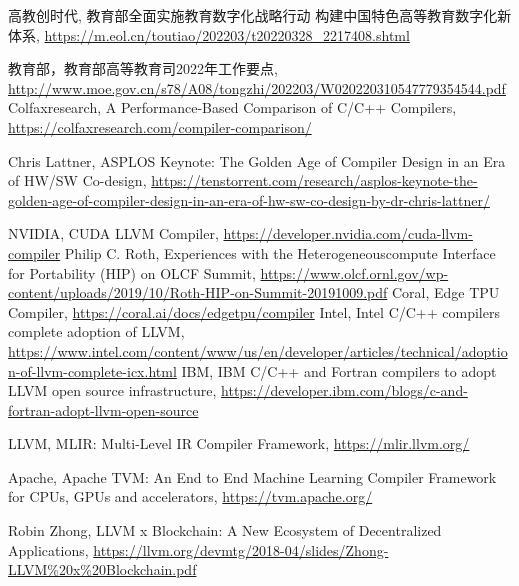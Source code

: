 \documentclass{SCIS2020cn}
\begin{document}
\begin{thebibliography}{99}
    高教创时代, 教育部全面实施教育数字化战略行动 构建中国特色高等教育数字化新体系, \url{https://m.eol.cn/toutiao/202203/t20220328_2217408.shtml}

    教育部，教育部高等教育司2022年工作要点, \url{http://www.moe.gov.cn/s78/A08/tongzhi/202203/W020220310547779354544.pdf}
     Colfaxresearch, A Performance-Based Comparison of C/C++ Compilers, \url{https://colfaxresearch.com/compiler-comparison/}

     Chris Lattner, ASPLOS Keynote: The Golden Age of Compiler Design in an Era of HW/SW Co-design, \url{https://tenstorrent.com/research/asplos-keynote-the-golden-age-of-compiler-design-in-an-era-of-hw-sw-co-design-by-dr-chris-lattner/}

     NVIDIA, CUDA LLVM Compiler, \url{https://developer.nvidia.com/cuda-llvm-compiler}
     Philip C. Roth, Experiences with the Heterogeneouscompute Interface for Portability (HIP) on
    OLCF Summit, \url{https://www.olcf.ornl.gov/wp-content/uploads/2019/10/Roth-HIP-on-Summit-20191009.pdf}
     Coral, Edge TPU Compiler, \url{https://coral.ai/docs/edgetpu/compiler}
     Intel, Intel C/C++ compilers complete adoption of LLVM, \url{https://www.intel.com/content/www/us/en/developer/articles/technical/adoption-of-llvm-complete-icx.html}
     IBM, IBM C/C++ and Fortran compilers to adopt LLVM open source infrastructure, \url{https://developer.ibm.com/blogs/c-and-fortran-adopt-llvm-open-source}

     LLVM, MLIR: Multi-Level IR Compiler Framework, \url{https://mlir.llvm.org/}

     Apache, Apache TVM: An End to End Machine Learning Compiler Framework for CPUs, GPUs and accelerators, \url{https://tvm.apache.org/}

     Robin Zhong, LLVM x Blockchain: A New Ecosystem of Decentralized Applications, \url{https://llvm.org/devmtg/2018-04/slides/Zhong-LLVM\%20x\%20Blockchain.pdf}


\end{thebibliography}
\end{document}
